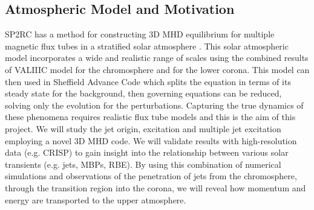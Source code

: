 \documentclass[12pt,a4paper,twoside]{article}
\begin{document}
\subsection{Atmospheric Model and Motivation}
SP2RC has a method for constructing 3D MHD equilibrium for multiple magnetic flux tubes in a stratified solar atmosphere \citep{Gent_2013p1,Gent_2014p2}. This solar atmospheric model incorporates a wide and realistic range of scales using the combined results of \cite{Vernazza1981}  VALIIIC model for the chromosphere and \cite{McWhirter1975} for the lower corona. This model can then used in Sheffield Advance Code \citep{Griffiths2013} which splits the equation in terms of its steady state for the background, then governing equations can be reduced, solving only the evolution for the perturbations. Capturing the true dynamics of these phenomena requires realistic flux tube models and this is the aim of this project. We will study the jet origin, excitation and multiple jet excitation employing a novel 3D MHD code. We will validate results with high-resolution data (e.g. CRISP) to gain insight into the relationship between various solar transients (e.g. jets, MBPs, RBE). By using this combination of numerical simulations and observations of the penetration of jets from the chromosphere, through the transition region into the corona, we will reveal how momentum and energy are transported to the upper atmosphere. \\ \\
\newpage


\newpage
\end{document}
